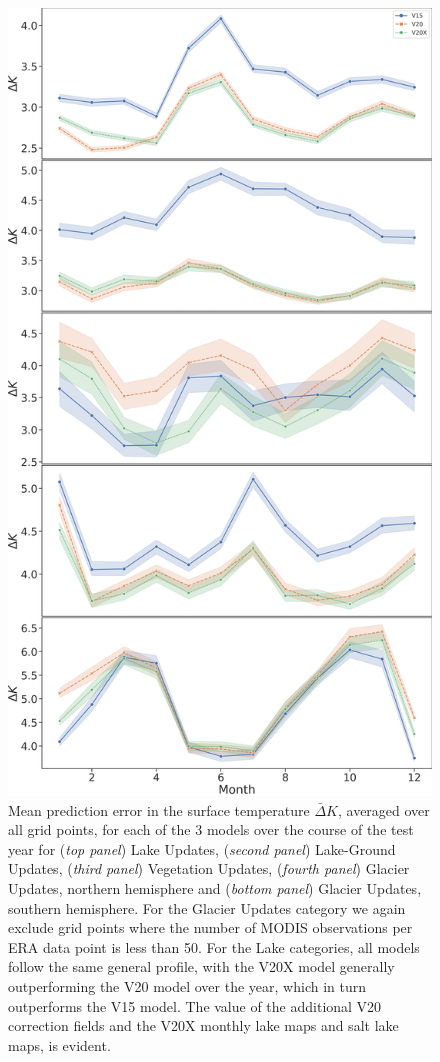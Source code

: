 \documentclass[twocolumn]{article}
\begin{document}
	\begin{figure}
		\includegraphics[width=\columnwidth]{mega_stack_ns.png}
		\caption{Mean prediction error in the surface temperature $\bar{\Delta} K$, averaged over all grid points, for each of the 3 models over the course of the test year for (\textit{top panel}) Lake Updates, (\textit{second panel}) Lake-Ground Updates, (\textit{third panel}) Vegetation Updates, (\textit{fourth panel}) Glacier Updates, northern hemisphere and (\textit{bottom panel}) Glacier Updates, southern hemisphere. For the Glacier Updates category we again exclude grid points where the number of MODIS observations per ERA data point is less than 50.  For the Lake categories, all models follow the same general profile, with the V20X model generally outperforming the V20 model over the year, which in turn outperforms the V15 model. The value of the additional V20 correction fields and the V20X monthly lake maps and salt lake maps, is evident.}
		\label{fig:timeseries}
	\end{figure}
	
\end{document}
